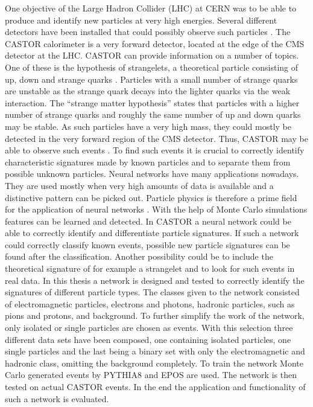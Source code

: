 One objective of the Large Hadron Collider (LHC) at CERN was to be able to produce and identify new particles at very high energies. Several different detectors have been installed that could possibly observe such particles \cite{atlas} \cite{cmscollab}.
The CASTOR calorimeter is a very forward detector, located at the edge of the CMS detector at the LHC. CASTOR can provide information on a number of topics. One of these is the hypothesis of strangelets, a theoretical particle consisting of up, down and strange quarks \cite{strangelet}. Particles with a small number of strange quarks are unstable as the strange quark decays into the lighter quarks via the weak interaction. The \enquote{strange matter hypothesis} states that particles with a higher number of strange quarks and roughly the same number of up and down quarks may be stable. As such particles have a very high mass, they could mostly be detected in the very forward region of the CMS detector. Thus, CASTOR may be able to observe such events \cite{strangeletcastor}. To find such events it is crucial to correctly identify characteristic signatures made by known particles and to separate them from possible unknown particles. \newline
Neural networks have many applications nowadays. They are used mostly when very high amounts of data is available and a distinctive pattern can be picked out. Particle physics is therefore a prime field for the application of neural networks \cite{dnnparticle1}\cite{dnnparticle2}\cite{dnnparticle3}. With the help of Monte Carlo simulations features can be learned and detected. In CASTOR a neural network could be able to correctly identify and differentiate particle signatures. If such a network could correctly classify known events, possible new particle signatures can be found after the classification. Another possibility could be to include the theoretical signature of for example a strangelet and to look for such events in real data. \newline
In this thesis a network is designed and tested to correctly identify the signatures of different particle types. The classes given to the network consisted of electromagnetic particles, electrons and photons, hadronic particles, such as pions and protons, and background. To further simplify the work of the network, only isolated or single particles are chosen as events. With this selection three different data sets have been composed, one containing isolated particles, one single particles and the last being a binary set with only the electromagnetic and hadronic class, omitting the background completely. To train the network Monte Carlo generated events by PYTHIA8 and EPOS are used. The network is then tested on actual CASTOR events. In the end the application and functionality of such a network is evaluated. 
